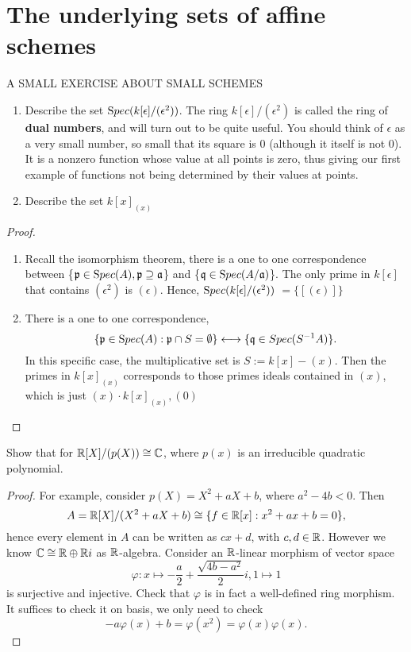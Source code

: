 \section{The underlying sets of affine schemes}
\begin{exr}
A SMALL EXERCISE ABOUT SMALL SCHEMES
\begin{enumerate}[label=(\alph*)]
\item Describe the set ${\text Spec}(k[\epsilon]/(\epsilon^2)) $. The ring $k[\epsilon]/(\epsilon^2)$ is called the ring of \textbf{dual numbers}, and will turn out to be quite useful. You should think of $\epsilon$ as a very small number, so small that its square is $0$ (although it itself is not $0$). It is a nonzero function whose value at all points is zero, thus giving our first example of functions not being determined by their values at points.
\item Describe the set $k[x]_{(x)}$
\end{enumerate}
\end{exr}
\begin{proof}\ 
\begin{enumerate}[label=(\alph*)]
\item Recall the isomorphism theorem, there is a one to one correspondence between \{${\mathfrak p}\in {\text Spec}(A),{\mathfrak p}\supseteq {\mathfrak a}$\} and \{$\mathfrak q\in {\text Spec}(A/{\mathfrak a})$\}. The only prime in $k[\epsilon]$ that contains $(\epsilon^2)$ is $(\epsilon)$. Hence, ${\text Spec}(k[\epsilon]/(\epsilon^2))$ $=\{[(\epsilon)]\}$
\item  There is a one to one correspondence,
$$
\{{\mathfrak p}\in {\text Spec}(A):{\mathfrak p}\cap S=\emptyset \}\longleftrightarrow\{\mathfrak q\in Spec(S^{-1}A)\}.
$$
In this specific case, the multiplicative set is $S:=k[x]-(x)$. Then the primes in $k[x]_{(x)}$ corresponds to those primes ideals contained in $(x)$, which is just $(x)\cdot k[x]_{(x)},(0)$  

\end{enumerate}
\end{proof}

\begin{exr}
Show that for $\mathbb R[X]/(p(X))\cong\mathbb C$, where $p(x)$ is an irreducible quadratic polynomial.
\end{exr}
\begin{proof}
For example, consider $p(X)=X^2+aX+b$, where $a^2-4b<0$. Then 
$$
A=\mathbb R[X]/(X^2+aX+b)\cong \{f\in\mathbb R[x]: x^2+ax+b=0\},
$$
hence every element in $A$ can be written as  $cx+d$, with $c,d\in\mathbb R$. However we know $\mathbb C\cong\mathbb R\oplus\mathbb R i$ as $\mathbb R$-algebra. Consider an $\mathbb R$-linear morphism of vector space 
$$
\varphi:x\longmapsto -\frac{a}{2}+\frac{\sqrt{4b-a^2}}{2} i, 1\longmapsto 1
$$ 
is surjective and injective. Check that $\varphi$ is in fact a well-defined ring morphism. It suffices to check it on basis, we only need to check 
$$
-a\varphi(x)+b=\varphi(x^2)=\varphi(x)\varphi(x).
$$
\end{proof}

